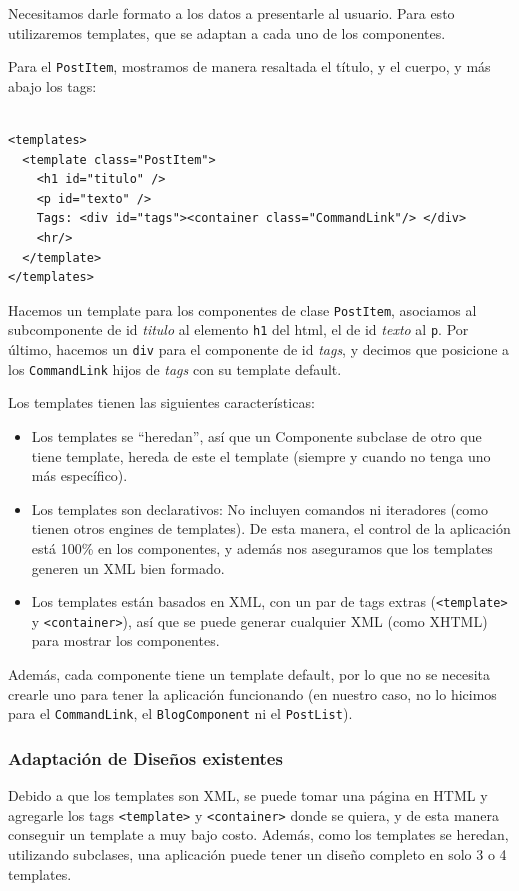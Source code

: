 Necesitamos darle formato a los datos a presentarle al usuario. Para esto utilizaremos templates, que se adaptan a cada uno de los componentes.

Para el \verb'PostItem', mostramos de manera resaltada el título, y el cuerpo, y más abajo los tags:

\begin{verbatim}

<templates>
  <template class="PostItem">
    <h1 id="titulo" />
    <p id="texto" />
    Tags: <div id="tags"><container class="CommandLink"/> </div>
    <hr/>
  </template>
</templates>

\end{verbatim}

Hacemos un template para los componentes de clase \verb'PostItem', asociamos al subcomponente de id \emph{titulo} al elemento \verb'h1' del html, el de id \emph{texto} al \verb'p'. Por último, hacemos un \verb'div' para el componente de id \emph{tags}, y decimos que posicione a los \verb'CommandLink' hijos de \emph{tags} con su template default.

Los templates tienen las siguientes características:
\begin{itemize}
\item Los templates se ``heredan'', así que un Componente subclase de otro que tiene template, hereda de este el template (siempre y cuando no tenga uno más específico).

\item Los templates son declarativos: No incluyen comandos ni iteradores (como tienen otros engines de templates). De esta manera, el control de la aplicación está 100\% en los componentes, y además nos aseguramos que los templates generen un XML bien formado.

\item Los templates están basados en XML, con un par de tags extras (\verb"<template>" y \verb"<container>"), así que se puede generar cualquier XML (como XHTML) para mostrar los componentes.
\end{itemize}

Además, cada componente tiene un template default, por lo que no se necesita crearle uno para tener la aplicación funcionando (en nuestro caso, no lo hicimos para el \verb'CommandLink', el \verb"BlogComponent" ni el \verb"PostList").

\subsubsection{Adaptación de Diseños existentes}
\label{sub-templates-adapt}
Debido a que los templates son XML, se puede tomar una página en HTML y agregarle los tags \verb"<template>" y \verb"<container>" donde se quiera, y de esta manera conseguir un template a muy bajo costo. Además, como los templates se heredan, utilizando
subclases, una aplicación puede tener un diseño completo en solo 3 o 4 templates.

